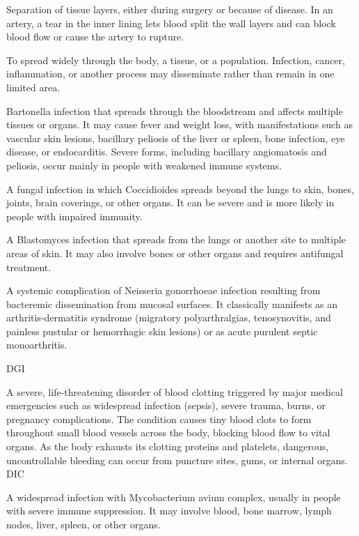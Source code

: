  Separation of tissue layers, either during surgery or because of disease. In an artery, a tear in the inner lining lets blood split the wall layers and can block blood flow or cause the artery to rupture.

 To spread widely through the body, a tissue, or a population. Infection, cancer, inflammation, or another process may disseminate rather than remain in one limited area.

 Bartonella infection that spreads through the bloodstream and affects multiple tissues or organs. It may cause fever and weight loss, with manifestations such as vascular skin lesions, bacillary peliosis of the liver or spleen, bone infection, eye disease, or endocarditis. Severe forms, including bacillary angiomatosis and peliosis, occur mainly in people with weakened immune systems.

 A fungal infection in which Coccidioides spreads beyond the lungs to skin, bones, joints, brain coverings, or other organs. It can be severe and is more likely in people with impaired immunity.

 A Blastomyces infection that spreads from the lungs or another site to multiple areas of skin. It may also involve bones or other organs and requires antifungal treatment.

 A systemic complication of Neisseria gonorrhoeae infection resulting from bacteremic dissemination from mucosal surfaces. It classically manifests as an arthritis-dermatitis syndrome (migratory polyarthralgias, tenosynovitis, and painless pustular or hemorrhagic skin lesions) or as acute purulent septic monoarthritis.

\synonyms
DGI

 A severe, life-threatening disorder of blood clotting triggered by major medical emergencies such as widespread infection (sepsis), severe trauma, burns, or pregnancy complications. The condition causes tiny blood clots to form throughout small blood vessels across the body, blocking blood flow to vital organs. As the body exhausts its clotting proteins and platelets, dangerous, uncontrollable bleeding can occur from puncture sites, gums, or internal organs.
\synonyms
DIC

 A widespread infection with Mycobacterium avium complex, usually in people with severe immune suppression. It may involve blood, bone marrow, lymph nodes, liver, spleen, or other organs.

